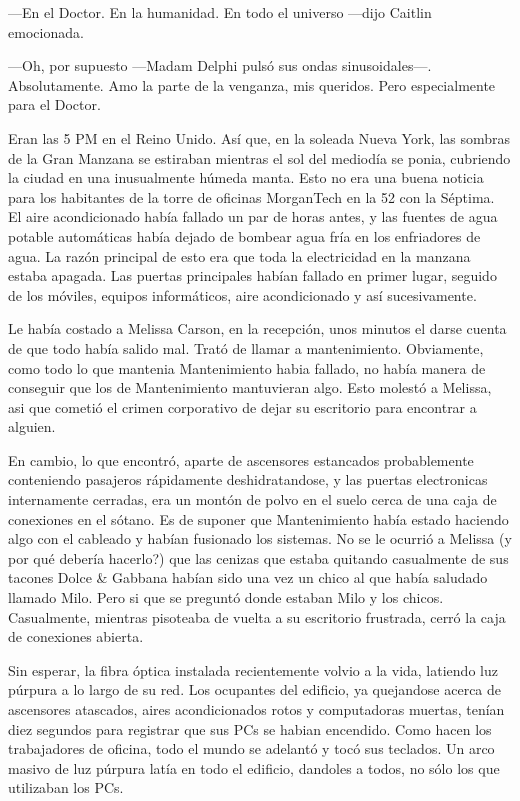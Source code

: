 ---En el Doctor. En la humanidad. En todo el universo ---dijo Caitlin
emocionada.

---Oh, por supuesto ---Madam Delphi pulsó sus ondas sinusoidales---.
Absolutamente. Amo la parte de la venganza, mis queridos. Pero
especialmente para el Doctor.

Eran las 5 PM en el Reino Unido. Así que, en la soleada Nueva York, las
sombras de la Gran Manzana se estiraban mientras el sol del mediodía se
ponia, cubriendo la ciudad en una inusualmente húmeda manta. Esto no era
una buena noticia para los habitantes de la torre de oficinas MorganTech
en la 52 con la Séptima. El aire acondicionado había fallado un par de
horas antes, y las fuentes de agua potable automáticas había dejado de
bombear agua fría en los enfriadores de agua. La razón principal de esto
era que toda la electricidad en la manzana estaba apagada. Las puertas
principales habían fallado en primer lugar, seguido de los móviles,
equipos informáticos, aire acondicionado y así sucesivamente.

Le había costado a Melissa Carson, en la recepción, unos minutos el
darse cuenta de que todo había salido mal. Trató de llamar a
mantenimiento. Obviamente, como todo lo que mantenia Mantenimiento habia
fallado, no había manera de conseguir que los de Mantenimiento
mantuvieran algo. Esto molestó a Melissa, asi que cometió el crimen
corporativo de dejar su escritorio para encontrar a alguien.

En cambio, lo que encontró, aparte de ascensores estancados
probablemente conteniendo pasajeros rápidamente deshidratandose, y las
puertas electronicas internamente cerradas, era un montón de polvo en el
suelo cerca de una caja de conexiones en el sótano. Es de suponer que
Mantenimiento había estado haciendo algo con el cableado y habían
fusionado los sistemas. No se le ocurrió a Melissa (y por qué debería
hacerlo?) que las cenizas que estaba quitando casualmente de sus tacones
Dolce \& Gabbana habían sido una vez un chico al que había saludado
llamado Milo. Pero si que se preguntó donde estaban Milo y los chicos.
Casualmente, mientras pisoteaba de vuelta a su escritorio frustrada,
cerró la caja de conexiones abierta.

Sin esperar, la fibra óptica instalada recientemente volvio a la vida,
latiendo luz púrpura a lo largo de su red. Los ocupantes del edificio,
ya quejandose acerca de ascensores atascados, aires acondicionados rotos
y computadoras muertas, tenían diez segundos para registrar que sus PCs
se habian encendido. Como hacen los trabajadores de oficina, todo el
mundo se adelantó y tocó sus teclados. Un arco masivo de luz púrpura
latía en todo el edificio, dandoles a todos, no sólo los que utilizaban
los PCs.

